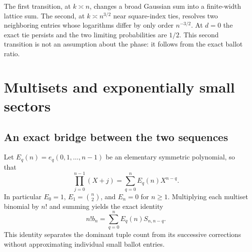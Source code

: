 \documentclass[11pt,a4paper]{article}
\numberwithin{equation}{section}
\theoremstyle{definition}
\begin{document}
The first transition, at $k\asymp n$, changes a broad Gaussian sum into
a finite-width lattice sum. The second, at $k\asymp n^{3/2}$ near
square-index ties, resolves two neighboring entries whose logarithms
differ by only order $n^{-3/2}$. At $d=0$ the exact tie persists and the
two limiting probabilities are $1/2$. This second transition is not an
assumption about the phase: it follows from the exact ballot ratio.

\section{Multisets and exponentially small sectors}\label{tbs:sec:multisets}

\subsection{An exact bridge between the two sequences}
Let $E_q(n)=e_q(0,1,\ldots,n-1)$ be an elementary symmetric polynomial,
so that
\begin{equation}\label{tbs:eq:rising}
 \prod_{j=0}^{n-1}(X+j)=\sum_{q=0}^{n}E_q(n)X^{n-q}.
\end{equation}
In particular $E_0=1$, $E_1=\binom n2$, and $E_n=0$ for $n\ge1$.
Multiplying each multiset binomial by $n!$ and summing yields the exact
identity
\begin{equation}\label{tbs:eq:sector-identity}
 \boxed{\displaystyle n!b_n=
       \sum_{q=0}^{n}E_q(n)S_{n,n-q}.}
\end{equation}
This identity separates the dominant tuple count from its successive
corrections without approximating individual small ballot entries.
\end{document}
